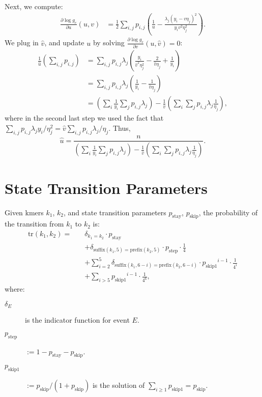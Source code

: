 \documentclass{article}
\newcommand{\pstay}{\ensuremath{p_\mathrm{stay}}}
\newcommand{\pskip}{\ensuremath{p_\mathrm{skip}}}
\newcommand{\pskipone}{\ensuremath{p_\mathrm{skip1}}}
\newcommand{\pstep}{\ensuremath{p_\mathrm{step}}}
\newcommand{\suffix}{\ensuremath{\mathrm{suffix}}}
\newcommand{\prefix}{\ensuremath{\mathrm{prefix}}}
\begin{document}
Next, we compute:
\begin{align*}
\frac{\partial \log g_e}{\partial u} (u, v) & =
\frac{1}{2} \sum_{i,j} p_{i,j} \left( \frac{1}{u} - \frac{\lambda_j (y_i - v \eta_j)^2}{y_i v^2 \eta^2_j} \right).
\end{align*}
We plug in $\hat{v}$, and update $u$ by solving $\frac{\partial \log g_e}{\partial v} (u, \hat{v}) = 0$:
\begin{align*}
\frac{1}{\hat{u}} \left( \sum_{i,j} p_{i,j} \right) & =
\sum_{i,j} p_{i,j} \lambda_j \left( \frac{y_i}{\hat{v}^2 \eta_j^2} - \frac{2}{\hat{v} \eta_j} + \frac{1}{y_i} \right)
\\
& = \sum_{i,j} p_{i,j} \lambda_j \left( \frac{1}{y_i} - \frac{1}{\hat{v} \eta_j} \right)
\\
& = \left( \sum_i \frac{1}{y_i} \sum_j p_{i,j} \lambda_j \right)
- \frac{1}{\hat{v}} \left( \sum_i \sum_j p_{i,j} \lambda_j \frac{1}{\eta_j} \right),
\end{align*}
where in the second last step we used the fact that $\sum_{i,j} p_{i,j} \lambda_j y_i / \eta_j^2 = \hat{v} \sum_{i,j} p_{i,j} \lambda_j / \eta_j$. Thus,
\[
\hat{u} = \frac{n}{\left( \sum_i \frac{1}{y_i} \sum_j p_{i,j} \lambda_j \right)
- \frac{1}{\hat{v}} \left( \sum_i \sum_j p_{i,j} \lambda_j \frac{1}{\eta_j} \right)}.
\]

\section{State Transition Parameters}
\label{transition-sec}

Given kmers $k_1$, $k_2$, and state transition parameters \pstay, \pskip, the probability of the transition from $k_1$ to $k_2$ is:
\begin{align*}
\mathrm{tr}(k_1, k_2) = \quad &
\delta_{k_1 = k_2} \cdot \pstay
\\
& + \delta_{\suffix(k_1, 5) = \prefix(k_2, 5)} \cdot \pstep \cdot \frac{1}{4}
\\
& + \sum_{i=2}^5 \delta_{\suffix(k_1, 6-i) = \prefix(k_2, 6-i)} \cdot \pskipone^{i-1} \cdot \frac{1}{4^i}
\\
& + \sum_{i>5} \pskipone^{i-1} \cdot \frac{1}{4^6},
\end{align*}
where:
\begin{description}
\item[$\delta_E$] is the indicator function for event $E$.
\item[$\pstep$] $:= 1 - \pstay - \pskip$.
\item[$\pskipone$] $:= \pskip / (1 + \pskip)$ is the solution of $\sum_{i \ge 1} \pskipone = \pskip$.
\end{description}
\end{document}
